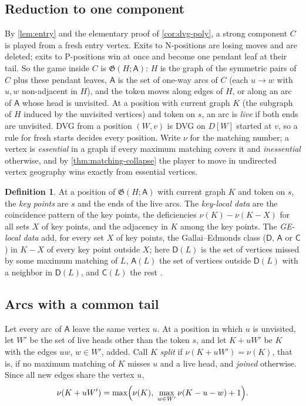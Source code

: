 \documentclass[11pt]{amsart}
\theoremstyle{plain}
\theoremstyle{definition}
\newtheorem{definition}[theorem]{Definition}
\theoremstyle{remark}
\numberwithin{equation}{section}
\newcommand{\game}{\mathfrak{G}}          %
\newcommand{\arcs}{\mathsf{A}}            %
\begin{document}
\subsection{Reduction to one component}\label{ssec:oneway-reduction}
By \cref{lem:entry} and the elementary proof of \cref{cor:dvg-poly}, a strong component $C$ is played from a fresh entry vertex. Exits to N-positions are losing moves and are deleted; exits to P-positions win at once and become one pendant leaf at their tail. So the game inside $C$ is $\game(H;\arcs)$: $H$ is the graph of the symmetric pairs of $C$ plus these pendant leaves, $\arcs$ is the set of one-way arcs of $C$ (each $u\to w$ with $u,w$ non-adjacent in $H$), and the token moves along edges of $H$, or along an arc of $\arcs$ whose head is unvisited. At a position with current graph $K$ (the subgraph of $H$ induced by the unvisited vertices) and token on $s$, an arc is \emph{live} if both ends are unvisited. DVG from a position $(W,v)$ is DVG on $D[W]$ started at $v$, so a rule for fresh starts decides every position. Write $\nu$ for the matching number; a vertex is \emph{essential} in a graph if every maximum matching covers it and \emph{inessential} otherwise, and by \cref{thm:matching-collapse} the player to move in undirected vertex geography wins exactly from essential vertices.

\begin{definition}\label{def:key-local}
At a position of $\game(H;\arcs)$ with current graph $K$ and token on $s$, the \emph{key points} are $s$ and the ends of the live arcs. The \emph{key-local data} are the coincidence pattern of the key points, the deficiencies $\nu(K)-\nu(K-X)$ for all sets $X$ of key points, and the adjacency in $K$ among the key points. The \emph{GE-local data} add, for every set $X$ of key points, the Gallai--Edmonds class ($\mathsf D$, $\mathsf A$ or $\mathsf C$) in $K-X$ of every key point outside $X$; here $\mathsf D(L)$ is the set of vertices missed by some maximum matching of $L$, $\mathsf A(L)$ the set of vertices outside $\mathsf D(L)$ with a neighbor in $\mathsf D(L)$, and $\mathsf C(L)$ the rest \cite{LovaszPlummer}.
\end{definition}

\subsection{Arcs with a common tail}

Let every arc of $\arcs$ leave the same vertex $u$. At a position in which $u$ is unvisited, let $W'$ be the set of live heads other than the token $s$, and let $K+uW'$ be $K$ with the edges $uw$, $w\in W'$, added. Call $K$ \emph{split} if $\nu(K+uW')=\nu(K)$, that is, if no maximum matching of $K$ misses $u$ and a live head, and \emph{joined} otherwise. Since all new edges share the vertex $u$,
\begin{equation}\label{eq:star-nu}
\nu(K+uW')=\max\Bigl(\nu(K),\ \max_{w\in W'}\nu(K-u-w)+1\Bigr).
\end{equation}
\end{document}

